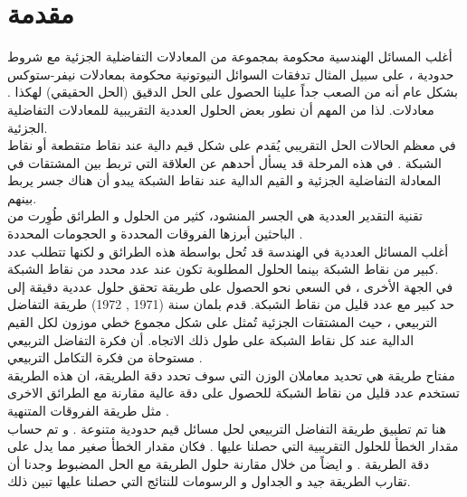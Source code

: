 \chapter*{مقدمة }
\noindent
أغلب المسائل الهندسية محكومة بمجموعة من المعادلات التفاضلية الجزئية \textbf{} مع شروط حدودية ، على سبيل المثال تدفقات السوائل النيوتونية محكومة بمعادلات نيفر-ستوكس\\ \textbf{  \cite{navier_stokes}}. بشكل عام أنه من الصعب جداً علينا الحصول على الحل الدقيق (الحل الحقيقي) لهكذا معادلات. لذا من المهم أن نطور بعض الحلول العددية التقريبية للمعادلات التفاضلية الجزئية.\\
\noindent
في معظم الحالات الحل التقريبي يُقدم على شكل قيم دالية عند نقاط متقطعة \textbf{} أو نقاط الشبكة \textbf{}. في هذه المرحلة قد يسأل أحدهم عن العلاقة التي تربط بين المشتقات في المعادلة التفاضلية الجزئية و القيم الدالية عند نقاط الشبكة يبدو أن هناك جسر يربط بينهم.\\
\noindent
تقنية التقدير العددية \textbf{} هي الجسر المنشود، كثير من الحلول و الطرائق طُوِرت من الباحثين أبرزها الفروقات المحددة \textbf{ \cite{finite_difference}} و الحجومات المحددة \textbf{ \cite{finite_volume}}.\\
\noindent
أغلب المسائل العددية في الهندسة قد تُحل بواسطة هذه الطرائق و لكنها تتطلب عدد كبير من نقاط الشبكة بينما الحلول المطلوبة تكون عند عدد محدد من نقاط الشبكة.\\
\noindent
في الجهة الأخرى ، في السعي نحو الحصول على طريقة تحقق حلول عددية دقيقة إلى حد كبير مع عدد قليل من نقاط الشبكة. قدم بلمان \textbf{ \cite{Bellman} 
} سنة (1971 , 1972) طريقة التفاضل التربيعي \textbf{}، حيث المشتقات الجزئية تُمثل على شكل مجموع خطي موزون لكل القيم الدالية عند كل نقاط الشبكة على طول ذلك الاتجاه. أن فكرة التفاضل التربيعي مستوحاة من فكرة التكامل التربيعي \textbf{}.\\
\noindent
مفتاح طريقة \textbf{} هي تحديد معاملان الوزن التي سوف تحدد دقة الطريقة، ان هذه الطريقة تستخدم عدد قليل من نقاط الشبكة للحصول على دقة عالية مقارنة مع الطرائق الاخرى مثل طريقة الفروقات المتنهية \textbf{ \cite{finite_difference}}.\\
\noindent
هنا تم تطبيق طريقة التفاضل التربيعي لحل مسائل قيم حدودية متنوعة . و تم حساب مقدار الخطأ للحلول التقريبية التي حصلنا عليها . فكان مقدار الخطأ صغير مما يدل على دقة الطريقة . و ايضاً من خلال مقارنة حلول الطريقة مع الحل المضبوط وجدنا أن تقارب الطريقة جيد و الجداول و الرسومات للنتائج التي حصلنا عليها تبين ذلك.
\restoregeometry